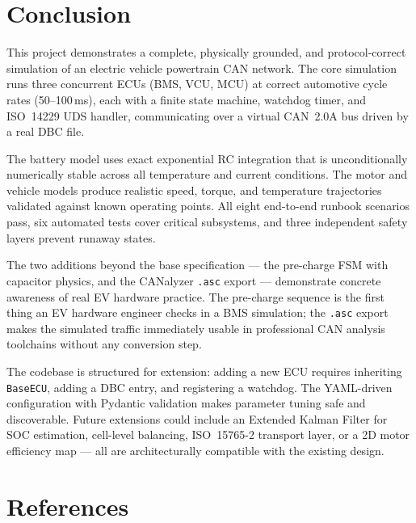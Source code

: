 \documentclass[12pt, a4paper, openany]{report}
\newcommand{\code}[1]{\texttt{#1}}
\begin{document}
\begin{center}
\chapter{Conclusion}

This project demonstrates a complete, physically grounded, and
protocol-correct simulation of an electric vehicle powertrain CAN network.
The core simulation runs three concurrent ECUs (BMS, VCU, MCU) at correct
automotive cycle rates (50--100\,ms), each with a finite state machine,
watchdog timer, and ISO~14229 UDS handler, communicating over a virtual
CAN~2.0A bus driven by a real DBC file.

The battery model uses exact exponential RC integration that is
unconditionally numerically stable across all temperature and current
conditions. The motor and vehicle models produce realistic speed, torque, and
temperature trajectories validated against known operating points. All eight
end-to-end runbook scenarios pass, six automated tests cover critical
subsystems, and three independent safety layers prevent runaway states.

The two additions beyond the base specification --- the pre-charge FSM with
capacitor physics, and the CANalyzer \code{.asc} export --- demonstrate
concrete awareness of real EV hardware practice. The pre-charge sequence is
the first thing an EV hardware engineer checks in a BMS simulation; the
\code{.asc} export makes the simulated traffic immediately usable in
professional CAN analysis toolchains without any conversion step.

The codebase is structured for extension: adding a new ECU requires
inheriting \code{BaseECU}, adding a DBC entry, and registering a watchdog.
The YAML-driven configuration with Pydantic validation makes parameter tuning
safe and discoverable. Future extensions could include an Extended Kalman
Filter for SOC estimation, cell-level balancing, ISO~15765-2 transport layer,
or a 2D motor efficiency map --- all are architecturally compatible with the
existing design.

\chapter{References}


\end{center}
\end{document}
